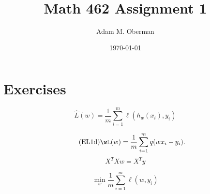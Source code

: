 \documentclass[12pt]{amsart}
\begin{document}
 
\title{Math 462 Assignment 1}
\author{Adam M. Oberman}
\date{\today}
\maketitle

\section{Exercises}
\begin{equation}\tag{EL}\label{EL}
	\widehat L(w) = \frac{1}{m} \sum_{i=1}^m \ell(h_w(x_i), y_i)
\end{equation}

\begin{equation}
	\label{EL1d}\tag{EL1d}
		\wL(w) = \frac 1 m \sum_{i=1}^m q(wx_i -y_i).
\end{equation}
\begin{equation}\label{linReg}
	X^TX w = X^T y
\end{equation}

\begin{equation}\label{CVIL}\tag{CVIL}
\min_w \frac 1 m \sum_{i=1}^m \ell(w,y_i)	
\end{equation}
\end{document}
